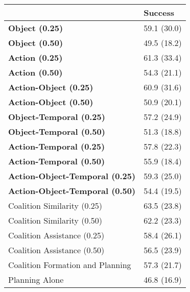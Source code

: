\begin{tabular}{ll}
\hline
                                        & Success     \\
\hline
 \textbf{Object (0.25)}                 & 59.1 (30.0) \\
 \textbf{Object (0.50)}                 & 49.5 (18.2) \\
 \textbf{Action (0.25)}                 & 61.3 (33.4) \\
 \textbf{Action (0.50)}                 & 54.3 (21.1) \\
 \textbf{Action-Object (0.25)}          & 60.9 (31.6) \\
 \textbf{Action-Object (0.50)}          & 50.9 (20.1) \\
 \textbf{Object-Temporal (0.25)}        & 57.2 (24.9) \\
 \textbf{Object-Temporal (0.50)}        & 51.3 (18.8) \\
 \textbf{Action-Temporal (0.25)}        & 57.8 (22.3) \\
 \textbf{Action-Temporal (0.50)}        & 55.9 (18.4) \\
 \textbf{Action-Object-Temporal (0.25)} & 59.3 (25.0) \\
 \textbf{Action-Object-Temporal (0.50)} & 54.4 (19.5) \\
 Coalition Similarity (0.25)            & 63.5 (23.8) \\
 Coalition Similarity (0.50)            & 62.2 (23.3) \\
 Coalition Assistance (0.25)            & 58.4 (26.1) \\
 Coalition Assistance (0.50)            & 56.5 (23.9) \\
 Coalition Formation and Planning       & 57.3 (21.7) \\
 Planning Alone                         & 46.8 (16.9) \\
\hline
\end{tabular}
